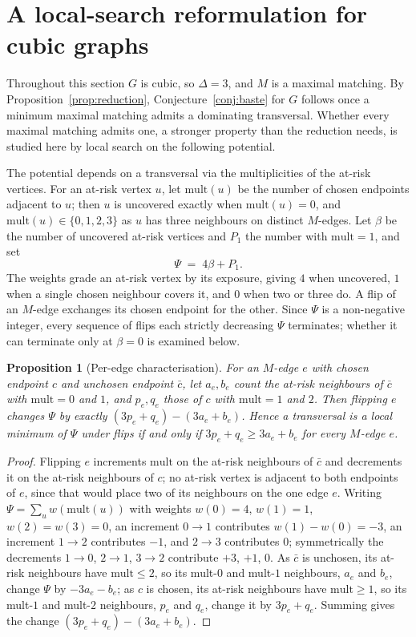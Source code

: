 \documentclass[11pt]{article}
\newtheorem{proposition}{Proposition}
\theoremstyle{definition}
\theoremstyle{remark}
\newcommand{\Pot}{\Psi}
\begin{document}
\section{A local-search reformulation for cubic graphs}\label{sec:cubic}

Throughout this section $G$ is cubic, so $\Delta = 3$, and $M$ is a maximal matching.
By Proposition~\ref{prop:reduction}, Conjecture~\ref{conj:baste} for $G$ follows
once a minimum maximal matching admits a dominating transversal. Whether every
maximal matching admits one, a stronger property than the reduction needs, is
studied here by local search on the following potential.

The potential depends on a transversal via the multiplicities of the at-risk
vertices. For an at-risk vertex $u$, let
$\mathrm{mult}(u)$ be the
number of chosen endpoints adjacent to $u$; then $u$ is uncovered exactly when
$\mathrm{mult}(u) = 0$, and $\mathrm{mult}(u) \in \{0,1,2,3\}$ as $u$ has three
neighbours on distinct $M$-edges. Let $\beta$ be
the number of uncovered at-risk vertices and $P_1$ the number with
$\mathrm{mult} = 1$, and set
\[
  \Pot \;=\; 4\beta + P_1 .
\]
The weights grade an at-risk vertex by its exposure, giving $4$ when
uncovered, $1$ when a single chosen neighbour covers it, and $0$ when two or
three do. A
flip of an $M$-edge exchanges its chosen endpoint for the other. Since
$\Pot$ is a non-negative integer, every sequence of flips each strictly decreasing
$\Pot$ terminates; whether it can terminate only at $\beta = 0$ is examined below.

\begin{proposition}[Per-edge characterisation]\label{prop:peredge}
For an $M$-edge $e$ with chosen endpoint $c$ and unchosen endpoint $\bar c$, let
$a_e, b_e$ count the at-risk neighbours of $\bar c$ with $\mathrm{mult} = 0$ and
$1$, and $p_e, q_e$ those of $c$ with $\mathrm{mult} = 1$ and $2$. Then flipping
$e$ changes $\Pot$ by exactly
$(3p_e + q_e) - (3a_e + b_e)$. Hence a transversal is a local minimum of
$\Pot$ under flips if and only if $3p_e + q_e \ge 3a_e + b_e$ for every $M$-edge
$e$.
\end{proposition}

\begin{proof}
Flipping $e$ increments $\mathrm{mult}$ on the at-risk neighbours of $\bar c$ and
decrements it on the at-risk neighbours of $c$; no at-risk vertex is adjacent to
both endpoints of $e$, since that would place two of its neighbours on the one
edge $e$. Writing $\Pot = \sum_u
w(\mathrm{mult}(u))$ with weights $w(0) = 4$, $w(1) = 1$, $w(2) = w(3) = 0$, an
increment $0\!\to\!1$ contributes $w(1)-w(0) = -3$, an increment $1\!\to\!2$
contributes $-1$, and $2\!\to\!3$ contributes $0$; symmetrically the decrements
$1\!\to\!0$, $2\!\to\!1$, $3\!\to\!2$ contribute $+3$, $+1$, $0$. As $\bar c$ is
unchosen, its at-risk neighbours have $\mathrm{mult} \le 2$, so its mult-$0$ and
mult-$1$ neighbours, $a_e$ and $b_e$, change $\Pot$ by $-3a_e - b_e$; as $c$ is
chosen, its at-risk neighbours have $\mathrm{mult} \ge 1$, so its mult-$1$ and
mult-$2$ neighbours, $p_e$ and $q_e$, change it by $3p_e + q_e$. Summing gives the
change $(3p_e + q_e) - (3a_e + b_e)$.
\end{proof}
\end{document}
